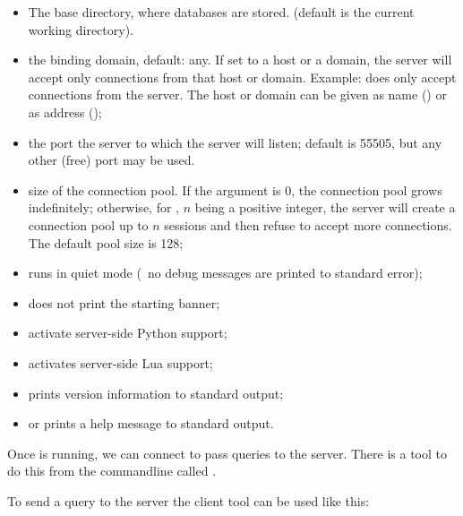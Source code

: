 \begin{itemize}
\item {} The base directory,
where databases are stored.
(default is the current working directory).

\item {} the binding domain, default:
any. If set to a host or a domain, the server
will accept only connections from that host
or domain. Example:  does
only accept connections from the server.
The host or domain can be given as name ()
or as  address ();

\item {} the port the server to which
the server will listen; default is 55505,
but any other (free) port may be used.
 
\item {} size of the connection pool.
If the argument is 0, the connection pool grows
indefinitely; otherwise, for ,
$n$ being a positive integer,
the server will create a connection pool
up to $n$ sessions and then refuse to accept
more connections. The default pool size is 128;

\item {} runs in quiet mode
(\ie\ no debug messages are printed to standard error);
\item {} does not print the starting banner;
\item {} activate server-side Python support;
\item {} activates server-side Lua support;
\item {} prints version information to standard output;
\item {} or  prints a help message to standard output.
\end{itemize}

Once  is running, we can connect to pass
queries to the server. There is a tool to do this from the commandline
called .


To send a query to the server
the client tool can be used like this:



